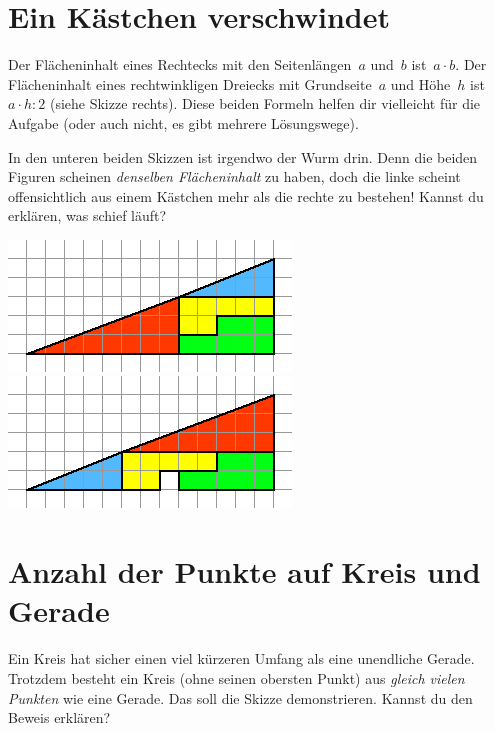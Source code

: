 \documentclass{../../zirkelblatt}
\begin{document}
\vfill
\section*{Ein Kästchen verschwindet}
\begin{floatingfigure}[r]{3.5cm}
  \vspace{-0.3cm}
  \scalebox{0.4}{}
\end{floatingfigure}
Der Flächeninhalt eines Rechtecks mit den Seitenlängen~$a$ und~$b$ ist~$a \cdot
b$. Der Flächeninhalt eines rechtwinkligen Dreiecks mit Grundseite~$a$ und
Höhe~$h$ ist~$a \cdot h : 2$ (siehe Skizze rechts). Diese beiden Formeln helfen
dir vielleicht für die Aufgabe (oder auch nicht, es gibt mehrere Lösungswege).

In den unteren beiden Skizzen ist irgendwo der Wurm drin. Denn die beiden
Figuren scheinen \emph{denselben Flächeninhalt} zu haben, doch die linke
scheint offensichtlich aus einem Kästchen mehr als die rechte zu bestehen!
Kannst du erklären, was schief läuft?

\begin{center}
  \includegraphics[scale=0.8]{ein-kaestchen-verschwindet-1}
  \hfill
  \includegraphics[scale=0.8]{ein-kaestchen-verschwindet-2}
\end{center}
\section*{Anzahl der Punkte auf Kreis und Gerade}
Ein Kreis hat sicher einen viel kürzeren Umfang als eine unendliche Gerade.
Trotzdem besteht ein Kreis (ohne seinen obersten Punkt) aus \emph{gleich vielen
Punkten} wie eine Gerade. Das soll die Skizze demonstrieren. Kannst du den
Beweis erklären?
\begin{center}

\end{center}
\end{document}
